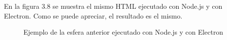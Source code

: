 En la figura 3.8 se muestra el mismo HTML ejecutado con Node.js y con Electron. Como se puede apreciar, el resultado es el mismo.

\begin{figure}[H]
  \begin{center}
    \caption{Ejemplo de la esfera anterior ejecutado con Node.js y con Electron}
     \label{fig.ejemplohtmlcomm}
     \end{center}
\end{figure}






